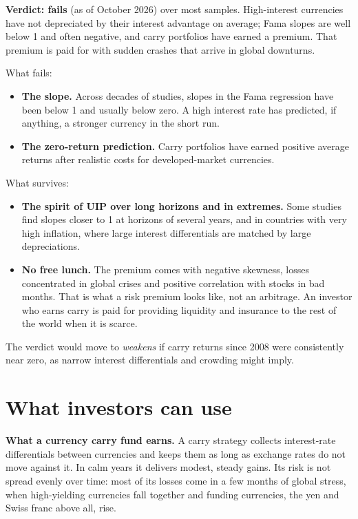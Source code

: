 \begin{callout}
\textbf{Verdict: fails} (as of October 2026) over most samples. High-interest currencies have not depreciated by their interest advantage on average; Fama slopes are well below 1 and often negative, and carry portfolios have earned a premium. That premium is paid for with sudden crashes that arrive in global downturns.
\end{callout}

What fails:

\begin{itemize}
  \item \textbf{The slope.} Across decades of studies, slopes in the Fama regression have been below 1 and usually below zero. A high interest rate has predicted, if anything, a stronger currency in the short run.
  \item \textbf{The zero-return prediction.} Carry portfolios have earned positive average returns after realistic costs for developed-market currencies.
\end{itemize}

What survives:

\begin{itemize}
  \item \textbf{The spirit of UIP over long horizons and in extremes.} Some studies find slopes closer to 1 at horizons of several years, and in countries with very high inflation, where large interest differentials are matched by large depreciations.
  \item \textbf{No free lunch.} The premium comes with negative skewness, losses concentrated in global crises and positive correlation with stocks in bad months. That is what a risk premium looks like, not an arbitrage. An investor who earns carry is paid for providing liquidity and insurance to the rest of the world when it is scarce.
\end{itemize}

The verdict would move to \emph{weakens} if carry returns since 2008 were consistently near zero, as narrow interest differentials and crowding might imply.

\section{What investors can use}
\label{sec:11-investors}

\textbf{What a currency carry fund earns.} A carry strategy collects interest-rate differentials between currencies and keeps them as long as exchange rates do not move against it. In calm years it delivers modest, steady gains. Its risk is not spread evenly over time: most of its losses come in a few months of global stress, when high-yielding currencies fall together and funding currencies, the yen and Swiss franc above all, rise.


